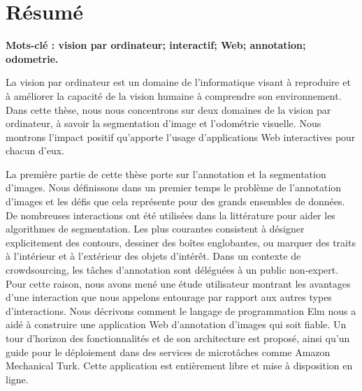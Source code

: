 \clearpage
\section*{Résumé}%
\label{sec:resume}

\textbf{Mots-clé : vision par ordinateur; interactif; Web; annotation; odometrie.}

La vision par ordinateur est un domaine de l'informatique visant à reproduire et à améliorer
la capacité de la vision humaine à comprendre son environnement.
Dans cette thèse, nous nous concentrons sur deux domaines de la vision par ordinateur,
à savoir la segmentation d'image et l'odométrie visuelle.
Nous montrons l'impact positif qu'apporte l'usage
d'applications Web interactives pour chacun d'eux.

La première partie de cette thèse porte sur l'annotation et la segmentation d'images.
Nous définissons dans un premier temps le problème de l'annotation d'images
et les défis que cela représente pour des grands ensembles de données.
De nombreuses interactions ont été utilisées dans la littérature
pour aider les algorithmes de segmentation.
Les plus courantes consistent à désigner explicitement des contours,
dessiner des boîtes englobantes,
ou marquer des traits à l'intérieur et à l'extérieur des objets d'intérêt.
Dans un contexte de crowdsourcing, les tâches d'annotation sont déléguées
à un public non-expert.
Pour cette raison, nous avons mené une étude utilisateur montrant
les avantages d'une interaction que nous appelons entourage par rapport aux autres types d'interactions.
Nous décrivons comment le langage de programmation Elm nous a aidé à
construire une application Web d'annotation d'images qui soit fiable.
Un tour d'horizon des fonctionnalités et de son architecture est proposé,
ainsi qu'un guide pour le déploiement dans des services de microtâches comme Amazon Mechanical Turk.
Cette application est entièrement libre et mise à disposition en ligne.

